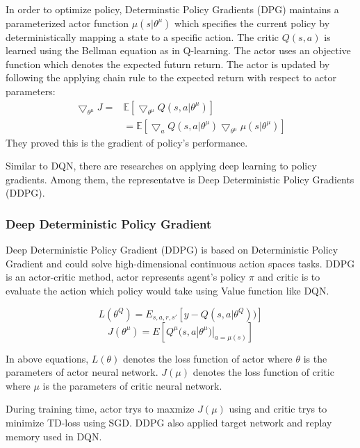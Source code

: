 \documentclass[11pt,twocolumn]{jarticle} %
\begin{document}
In order to optimize policy, Determinstic Policy Gradients (DPG) maintains a parameterized actor function $\mu(s|\theta^\mu)$ which specifies the current policy by deterministically mapping a state to a specific action. The critic $Q(s, a)$ is learned using the Bellman equation as in Q-learning. The actor uses an objective function which denotes the expected futurn return. The actor is updated by following the applying chain rule to the expected return with respect to actor parameters:
\begin{equation}
\begin{split}
\bigtriangledown_{\theta^\mu}J = & \mathbb{E}[\bigtriangledown_{\theta^\mu}Q(s, a|\theta^\mu)] \\
& = \mathbb{E}[\bigtriangledown_{a}Q(s, a|\theta^\mu)\bigtriangledown_{\theta^\mu}\mu(s|\theta^\mu)]
\end{split}
\end{equation}
They proved this is the gradient of policy's performance. \par

Similar to DQN, there are researches on applying deep learning to policy gradients. Among them, the representatve is Deep Deterministic Policy Gradients (DDPG)\cite{ddpg}. 

\subsubsection{Deep Deterministic Policy Gradient\cite{ddpg}}
Deep Deterministic Policy Gradient (DDPG) is based on Deterministic Policy Gradient \cite{dpg} and could solve high-dimensional continuous action spaces tasks. DDPG is an actor-critic method, actor represents agent's policy $\pi$ and critic is to evaluate the action which policy would take using Value function like DQN. 

\begin{equation}
L(\theta^Q) = E_{s,a,r,s'}[y - Q(s, a|\theta^Q))] 
\end{equation}
\begin{equation}
J(\theta^\mu) = E[Q^\mu(s, a|\theta^\mu) | _{a=\mu(s)}]
\end{equation}

In above equations, $L(\theta)$ denotes the loss function of actor where $\theta$ is the parameters of actor neural network. $J(\mu)$ denotes the loss function of critic where $\mu$ is the parameters of critic neural network. \par
During training time, actor trys to maxmize $J(\mu)$ using  and critic trys to minimize TD-loss using SGD. DDPG also applied target network and replay memory used in DQN. \par
\end{document}
